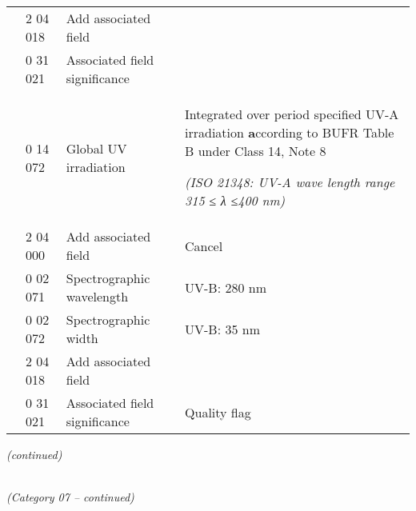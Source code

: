 \begin{longtable}[]{@{}llll@{}}
& 2 04 018 & Add associated field &\tabularnewline
& 0 31 021 & Associated field significance &\tabularnewline
\begin{minipage}[t]{0.22\columnwidth}\raggedright
\strut
\end{minipage} & \begin{minipage}[t]{0.22\columnwidth}\raggedright
0 14 072\strut
\end{minipage} & \begin{minipage}[t]{0.22\columnwidth}\raggedright
Global UV irradiation\strut
\end{minipage} & \begin{minipage}[t]{0.22\columnwidth}\raggedright
Integrated over period specified \textbf{\textbar{}} UV-A irradiation \textbf{\textbar{} a}ccording to BUFR Table B under Class 14, Note 8

\emph{(ISO 21348: UV-A wave length range 315 ≤ λ ≤400 nm)}\strut
\end{minipage}\tabularnewline
& 2 04 000 & Add associated field & Cancel\tabularnewline
& 0 02 071 & Spectrographic wavelength & UV-B: 280 nm\tabularnewline
& 0 02 072 & Spectrographic width & UV-B: 35 nm\tabularnewline
& 2 04 018 & Add associated field &\tabularnewline
& 0 31 021 & Associated field significance & Quality flag\tabularnewline
\bottomrule
\end{longtable}

\emph{(continued)}

\emph{\\
(Category 07 -- continued)}

